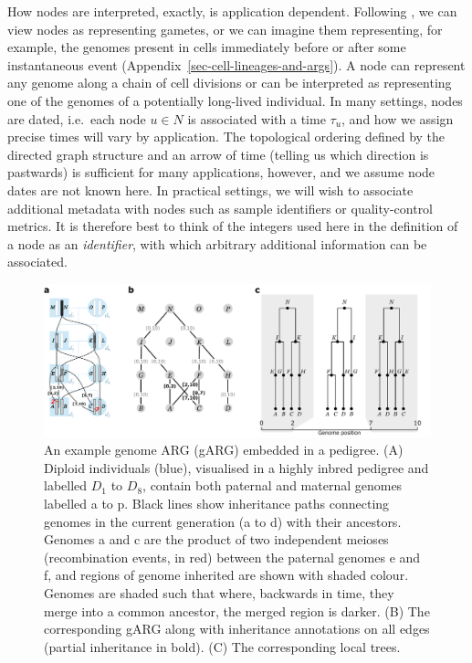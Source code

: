 \documentclass[9pt,twocolumn,twoside]{gsajnl}
\newcommand{\noderef}[1]{\textsf{#1}}
\begin{document}
How nodes are interpreted, exactly, is application dependent.
Following \citet{hudson1983properties}, we can view nodes
as representing gametes, or we can imagine them representing,
for example, the genomes present in cells immediately before or after
some instantaneous event (Appendix~\ref{sec-cell-lineages-and-args}).
A node can represent any genome along a chain of cell divisions
or can be interpreted as representing one of the genomes of a
potentially long-lived individual.
In many settings, nodes are dated, i.e.\ each
node $u\in N$ is associated with a time $\tau_u$,
and how we assign precise times will vary by application.
The topological ordering defined by the directed graph structure
and an arrow of time (telling us which direction is pastwards)
is sufficient for many applications, however,
and we assume node dates are not known here.
In practical settings, we will wish to associate additional
metadata with nodes such as sample identifiers or quality-control metrics.
It is therefore best to think of the
integers used here in the definition of a node as an \emph{identifier},
with which arbitrary additional information can be associated.

\begin{figure}
\begin{center}
    \includegraphics[width=\textwidth]{illustrations/arg-in-pedigree}
\end{center}
\caption{\label{fig-arg-in-pedigree}
An example genome ARG (gARG) embedded in a pedigree.
(A) Diploid individuals (blue), visualised in a highly inbred pedigree and
labelled $D_1$ to $D_8$,
contain both paternal and maternal  genomes
labelled \noderef{a} to \noderef{p}. Black lines show inheritance paths connecting
genomes in the current generation (\noderef{a} to \noderef{d}) with their ancestors.
Genomes \noderef{a} and \noderef{c} are the product of two independent
meioses (recombination events, in red) between
the paternal genomes \noderef{e}
and \noderef{f}, and regions of genome inherited are shown with shaded colour.
Genomes are shaded such that where, backwards in time,
they merge into a common ancestor, the merged region is darker.
(B) The corresponding gARG along with inheritance annotations on all edges
(partial inheritance in bold).
(C) The corresponding local trees.
}
\end{figure}
\end{document}
